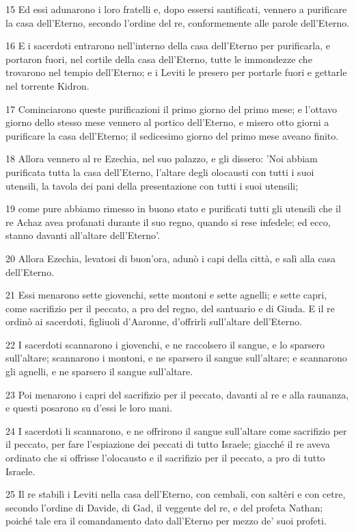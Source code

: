 \par 15 Ed essi adunarono i loro fratelli e, dopo essersi santificati, vennero a purificare la casa dell'Eterno, secondo l'ordine del re, conformemente alle parole dell'Eterno.
\par 16 E i sacerdoti entrarono nell'interno della casa dell'Eterno per purificarla, e portaron fuori, nel cortile della casa dell'Eterno, tutte le immondezze che trovarono nel tempio dell'Eterno; e i Leviti le presero per portarle fuori e gettarle nel torrente Kidron.
\par 17 Cominciarono queste purificazioni il primo giorno del primo mese; e l'ottavo giorno dello stesso mese vennero al portico dell'Eterno, e misero otto giorni a purificare la casa dell'Eterno; il sedicesimo giorno del primo mese aveano finito.
\par 18 Allora vennero al re Ezechia, nel suo palazzo, e gli dissero: 'Noi abbiam purificata tutta la casa dell'Eterno, l'altare degli olocausti con tutti i suoi utensili, la tavola dei pani della presentazione con tutti i suoi utensili;
\par 19 come pure abbiamo rimesso in buono stato e purificati tutti gli utensili che il re Achaz avea profanati durante il suo regno, quando si rese infedele; ed ecco, stanno davanti all'altare dell'Eterno'.
\par 20 Allora Ezechia, levatosi di buon'ora, adunò i capi della città, e salì alla casa dell'Eterno.
\par 21 Essi menarono sette giovenchi, sette montoni e sette agnelli; e sette capri, come sacrifizio per il peccato, a pro del regno, del santuario e di Giuda. E il re ordinò ai sacerdoti, figliuoli d'Aaronne, d'offrirli sull'altare dell'Eterno.
\par 22 I sacerdoti scannarono i giovenchi, e ne raccolsero il sangue, e lo sparsero sull'altare; scannarono i montoni, e ne sparsero il sangue sull'altare; e scannarono gli agnelli, e ne sparsero il sangue sull'altare.
\par 23 Poi menarono i capri del sacrifizio per il peccato, davanti al re e alla raunanza, e questi posarono su d'essi le loro mani.
\par 24 I sacerdoti li scannarono, e ne offrirono il sangue sull'altare come sacrifizio per il peccato, per fare l'espiazione dei peccati di tutto Israele; giacché il re aveva ordinato che si offrisse l'olocausto e il sacrifizio per il peccato, a pro di tutto Israele.
\par 25 Il re stabilì i Leviti nella casa dell'Eterno, con cembali, con saltèri e con cetre, secondo l'ordine di Davide, di Gad, il veggente del re, e del profeta Nathan; poiché tale era il comandamento dato dall'Eterno per mezzo de' suoi profeti.
